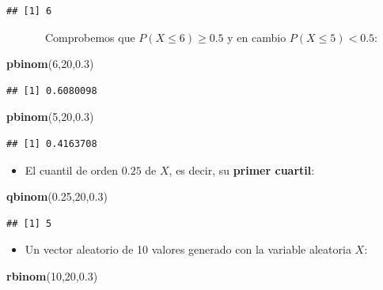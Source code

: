 \documentclass[]{book}
\newenvironment{Shaded}{\begin{snugshade}}{\end{snugshade}}
\newcommand{\DecValTok}[1]{\textcolor[rgb]{0.00,0.00,0.81}{#1}}
\newcommand{\FloatTok}[1]{\textcolor[rgb]{0.00,0.00,0.81}{#1}}
\newcommand{\KeywordTok}[1]{\textcolor[rgb]{0.13,0.29,0.53}{\textbf{#1}}}
\newcommand{\NormalTok}[1]{#1}
\providecommand{\tightlist}{%
  \setlength{\itemsep}{0pt}\setlength{\parskip}{0pt}}
\theoremstyle{definition}
\theoremstyle{definition}
\theoremstyle{definition}
\theoremstyle{remark}
\begin{document}
\begin{verbatim}
## [1] 6
\end{verbatim}

~~~~~~~Comprobemos que \(P(X\leqslant 6)\geqslant 0.5\) y en cambio \(P(X\leqslant 5)< 0.5\):

\begin{Shaded}
\begin{Highlighting}[]
\KeywordTok{pbinom}\NormalTok{(}\DecValTok{6}\NormalTok{,}\DecValTok{20}\NormalTok{,}\FloatTok{0.3}\NormalTok{) }
\end{Highlighting}
\end{Shaded}

\begin{verbatim}
## [1] 0.6080098
\end{verbatim}

\begin{Shaded}
\begin{Highlighting}[]
\KeywordTok{pbinom}\NormalTok{(}\DecValTok{5}\NormalTok{,}\DecValTok{20}\NormalTok{,}\FloatTok{0.3}\NormalTok{) }
\end{Highlighting}
\end{Shaded}

\begin{verbatim}
## [1] 0.4163708
\end{verbatim}

\begin{itemize}
\tightlist
\item
  El cuantil de orden \(0.25\) de \(X\), es decir, su \textbf{primer cuartil}:
\end{itemize}

\begin{Shaded}
\begin{Highlighting}[]
\KeywordTok{qbinom}\NormalTok{(}\FloatTok{0.25}\NormalTok{,}\DecValTok{20}\NormalTok{,}\FloatTok{0.3}\NormalTok{)  }
\end{Highlighting}
\end{Shaded}

\begin{verbatim}
## [1] 5
\end{verbatim}

\begin{itemize}
\tightlist
\item
  Un vector aleatorio de 10 valores generado con la variable aleatoria \(X\):
\end{itemize}

\begin{Shaded}
\begin{Highlighting}[]
\KeywordTok{rbinom}\NormalTok{(}\DecValTok{10}\NormalTok{,}\DecValTok{20}\NormalTok{,}\FloatTok{0.3}\NormalTok{)}
\end{Highlighting}
\end{Shaded}
\end{document}
